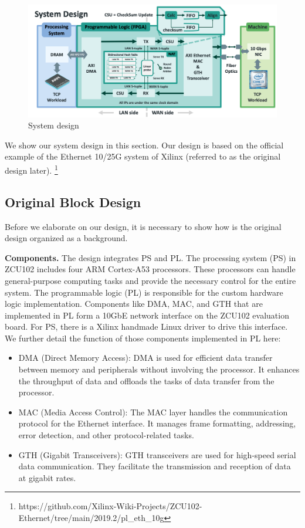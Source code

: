\begin{figure}[ht]
    \centering
    \includegraphics[width=\linewidth]{images/design.png}
    \caption{System design}
    \label{fig:design}
    \Description{}
\end{figure}
    We show our system design in this section. Our design is based on the official example of the Ethernet 10/25G system of Xilinx (referred to as the original design later). \footnote{https://github.com/Xilinx-Wiki-Projects/ZCU102-Ethernet/tree/main/2019.2/pl\_eth\_10g}

\subsection{Original Block Design}
    Before we elaborate on our design, it is necessary to show how is the original design organized as a background.

    \textbf{Components.} The design integrates PS and PL. The processing system (PS) in ZCU102 includes four ARM Cortex-A53 processors. These processors can handle general-purpose computing tasks and provide the necessary control for the entire system. The programmable logic (PL) is responsible for the custom hardware logic implementation. 
    Components like DMA, MAC, and GTH that are implemented in PL form a 10GbE network interface on the ZCU102 evaluation board. For PS, there is a Xilinx handmade Linux driver to drive this interface. We further detail the function of those components implemented in PL here:

    \begin{itemize}
    \item {DMA (Direct Memory Access)}: DMA is used for efficient data transfer between memory and peripherals without involving the processor. It enhances the throughput of data and offloads the tasks of data transfer from the processor.
    \item {MAC (Media Access Control)}: The MAC layer handles the communication protocol for the Ethernet interface. It manages frame formatting, addressing, error detection, and other protocol-related tasks.
    \item {GTH (Gigabit Transceivers)}: GTH transceivers are used for high-speed serial data communication. They facilitate the transmission and reception of data at gigabit rates.
    \end{itemize}

